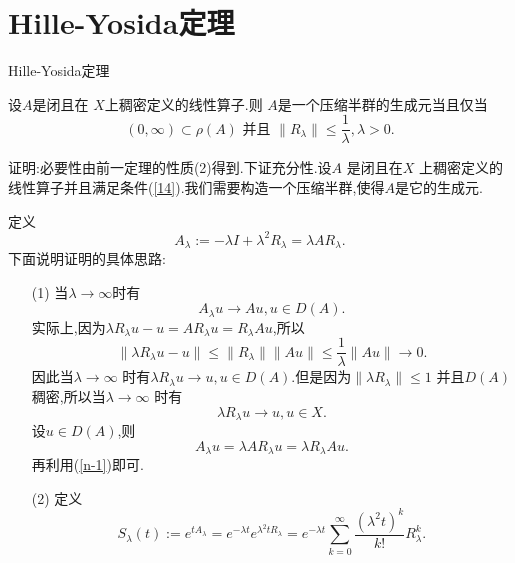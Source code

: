 \section{Hille-Yosida定理}
\begin{frame}[t]{Hille-Yosida定理}
  \begin{theorem}
  设$A$是闭且在 $X$上稠密定义的线性算子.则 $A$是一个压缩半群的生成元当且仅当
   \begin{equation}
     (0,\infty)\subset \rho(A) \text{ 并且 }\|R_\lambda\|\le \frac{1}{\lambda}, \lambda>0.\label{14}
  \end{equation}
\end{theorem}
证明:必要性由前一定理的性质(2)得到.下证充分性.设$A$ 是闭且在$X$ 上稠密定义的线性算子并且满足条件(\ref{14}).我们需要构造一个压缩半群,使得$A$是它的生成元.

定义
 \[
A_\lambda := -\lambda I +\lambda ^2 R_\lambda =\lambda A R_\lambda.
\]
下面说明证明的具体思路:
\end{frame}
\begin{frame}[t]
\begin{enumerate}
  \item [(1)] 当$\lambda\to \infty$时有
    \[
    A_\lambda u\to Au,u\in D(A).
  \]
  实际上,因为$\lambda R_\lambda u - u=AR_\lambda u =R_\lambda A u$,所以
    \[
    \|\lambda R_\lambda u -u\|\le \|R_\lambda\|\|Au\|\le \frac{1}{\lambda}\|Au\|\to 0.
    \] 
    因此当$\lambda\to \infty$ 时有$\lambda R_\lambda u\to u,u\in D(A)$.但是因为$\|\lambda R_\lambda\|\le 1$ 
    并且$D(A)$稠密,所以当$\lambda\to \infty$ 时有
    \begin{equation}\label{n-1}
    \lambda R_\lambda u \to u, u\in X.
  \end{equation} 
    设$u\in D(A)$,则
    \[
    A_\lambda u =\lambda AR_\lambda u=\lambda R_\lambda Au.
    \] 
   再利用(\ref{n-1})即可.
  \item [(2)] 定义
    \[
      S_\lambda(t):=e^{t A_\lambda}=e^{-\lambda t}e^{\lambda^2 t R_\lambda}=e^{-\lambda t}\sum_{k=0}^{\infty} \frac{(\lambda^2 t)^{k}}{k!}R_\lambda^{k}.
    \]
\end{enumerate}
\end{frame}
